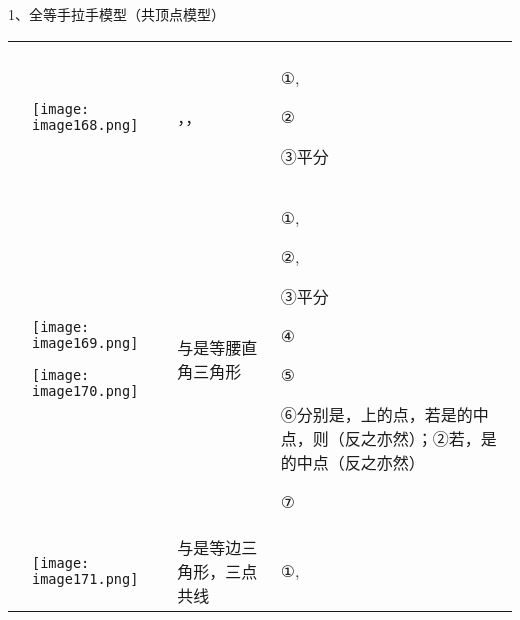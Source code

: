 1、全等手拉手模型（共顶点模型）

\begin{longtable}[]{@{}llll@{}}
\toprule
\endhead
& & &\tabularnewline
\begin{minipage}[t]{0.22\columnwidth}\raggedright
\strut
\end{minipage} & \begin{minipage}[t]{0.22\columnwidth}\raggedright
\texttt{[image: image168.png]}\strut
\end{minipage} & \begin{minipage}[t]{0.22\columnwidth}\raggedright
，，\strut
\end{minipage} & \begin{minipage}[t]{0.22\columnwidth}\raggedright
①,

②

③平分\strut
\end{minipage}\tabularnewline
\begin{minipage}[t]{0.22\columnwidth}\raggedright
\strut
\end{minipage} & \begin{minipage}[t]{0.22\columnwidth}\raggedright
\texttt{[image: image169.png]}

\texttt{[image: image170.png]}\strut
\end{minipage} & \begin{minipage}[t]{0.22\columnwidth}\raggedright
与是等腰直角三角形\strut
\end{minipage} & \begin{minipage}[t]{0.22\columnwidth}\raggedright
①,

②,

③平分

④

⑤

⑥分别是，上的点，若是的中点，则（反之亦然）；②若，是的中点（反之亦然）

⑦\strut
\end{minipage}\tabularnewline
\begin{minipage}[t]{0.22\columnwidth}\raggedright
\strut
\end{minipage} & \begin{minipage}[t]{0.22\columnwidth}\raggedright
\texttt{[image: image171.png]}\strut
\end{minipage} & \begin{minipage}[t]{0.22\columnwidth}\raggedright
与是等边三角形，三点共线\strut
\end{minipage} & \begin{minipage}[t]{0.22\columnwidth}\raggedright
①,


\end{minipage}
\end{longtable}
